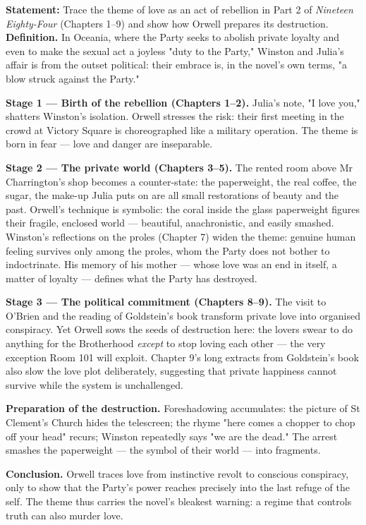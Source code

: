 \documentclass[11pt]{article}
\begin{document}
\begin{exoresolu}
\textbf{Statement:} Trace the theme of love as an act of rebellion in Part 2 of \emph{Nineteen Eighty-Four} (Chapters 1--9) and show how Orwell prepares its destruction.
\tcblower
\textbf{Definition.} In Oceania, where the Party seeks to abolish private loyalty and even to make the sexual act a joyless "duty to the Party," Winston and Julia's affair is from the outset political: their embrace is, in the novel's own terms, "a blow struck against the Party."

\textbf{Stage 1 — Birth of the rebellion (Chapters 1--2).} Julia's note, "I love you," shatters Winston's isolation. Orwell stresses the risk: their first meeting in the crowd at Victory Square is choreographed like a military operation. The theme is born in fear — love and danger are inseparable.

\textbf{Stage 2 — The private world (Chapters 3--5).} The rented room above Mr Charrington's shop becomes a counter-state: the paperweight, the real coffee, the sugar, the make-up Julia puts on are all small restorations of beauty and the past. Orwell's technique is symbolic: the coral inside the glass paperweight figures their fragile, enclosed world — beautiful, anachronistic, and easily smashed. Winston's reflections on the proles (Chapter 7) widen the theme: genuine human feeling survives only among the proles, whom the Party does not bother to indoctrinate. His memory of his mother — whose love was an end in itself, a matter of loyalty — defines what the Party has destroyed.

\textbf{Stage 3 — The political commitment (Chapters 8--9).} The visit to O'Brien and the reading of Goldstein's book transform private love into organised conspiracy. Yet Orwell sows the seeds of destruction here: the lovers swear to do anything for the Brotherhood \emph{except} to stop loving each other — the very exception Room 101 will exploit. Chapter 9's long extracts from Goldstein's book also slow the love plot deliberately, suggesting that private happiness cannot survive while the system is unchallenged.

\textbf{Preparation of the destruction.} Foreshadowing accumulates: the picture of St Clement's Church hides the telescreen; the rhyme "here comes a chopper to chop off your head" recurs; Winston repeatedly says "we are the dead." The arrest smashes the paperweight — the symbol of their world — into fragments.

\textbf{Conclusion.} Orwell traces love from instinctive revolt to conscious conspiracy, only to show that the Party's power reaches precisely into the last refuge of the self. The theme thus carries the novel's bleakest warning: a regime that controls truth can also murder love.
\end{exoresolu}
\end{document}
